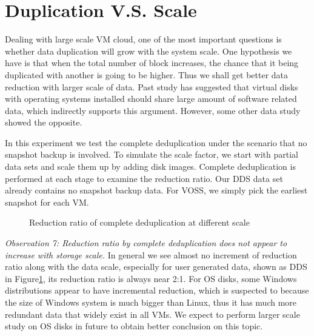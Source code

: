 \section{Duplication V.S. Scale}
Dealing with large scale VM cloud, one of the most important questions is
whether data duplication will grow with the system scale. 
One hypothesis we have is that when the total number of block increases,
the chance that it being duplicated with another is going to be higher. Thus
we shall get better data reduction with larger scale of data.
Past study\cite{keren08} has suggested that virtual disks with 
operating systems installed should share large amount of software related data,
which indirectly supports this argument.
However, some other data study\cite{middleware11} showed the opposite.

In this experiment we test the complete deduplication under the scenario
that no snapshot backup is involved. To simulate the scale factor,
we start with partial data sets and scale them up by adding disk images.
Complete deduplication is performed at each stage to examine the reduction ratio.
Our DDS data set already contains no snapshot backup data. For VOSS, we simply pick
the earliest snapshot for each VM.

\begin{figure}
  \centering
  \caption{Reduction ratio of complete deduplication at different scale}
  \label{fig:scale}
\end{figure}

\emph{Observation 7: Reduction ratio by complete deduplication does not appear to increase with storage scale.}
In general we see almost no increment of reduction ratio along with the data scale, especially
for user generated data, shown as DDS in Figure\ref{fig:scale}, its reduction ratio is always
near 2:1. For OS disks, some Windows distributions appear to have incremental reduction, which is suspected to
because the size of Windows system is much bigger than Linux, thus it has much more redundant
data that widely exist in all VMs. We expect to perform larger scale study on OS disks in future
to obtain better conclusion on this topic.